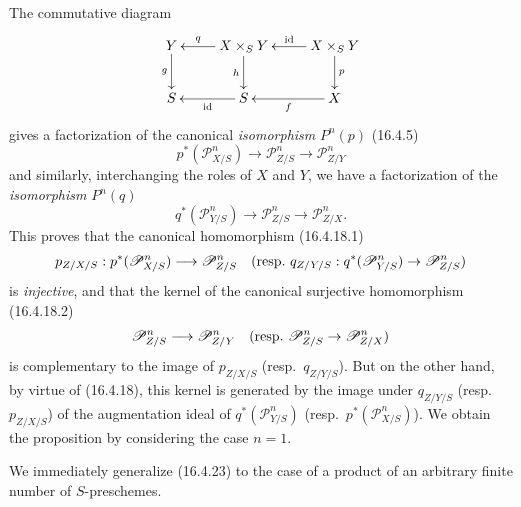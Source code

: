 The commutative diagram
\[
  \xymatrix{
    Y\ar[d]_-g&X\times_S Y\ar[l]_-q\ar[d]_-h&
      X\times_S Y\ar[l]_-{\operatorname{id}}\ar[d]^-p\\
    S&S\ar[l]^-{\operatorname{id}}&X\ar[l]^-f
  }
\]
gives a factorization of the canonical \emph{isomorphism} $P^n(p)$ (16.4.5)
\[
  p^*(\mathscr{P}_{X/S}^n)\longrightarrow
  \mathscr{P}_{Z/S}^n\longrightarrow\mathscr{P}_{Z/Y}^n
\]
and similarly, interchanging the roles of $X$ and $Y$, we have a factorization
of the \emph{isomorphism} $P^n(q)$
\[
  q^*(\mathscr{P}_{Y/S}^n)\longrightarrow
  \mathscr{P}_{Z/S}^n\longrightarrow\mathscr{P}_{Z/X}^n.
\]
This proves that the canonical homomorphism (16.4.18.1)
\[
  p_{Z/X/S}:p^*(\mathscr{P}_{X/S}^n)\longrightarrow\mathscr{P}_{Z/S}^n
  \quad\text{(resp.\
  $q_{Z/Y/S}:q^*(\mathscr{P}_{Y/S}^n)\to\mathscr{P}_{Z/S}^n$)}
\]
is \emph{injective}, and that the kernel of the canonical surjective homomorphism
(16.4.18.2)
\[
  \mathscr{P}_{Z/S}^n\longrightarrow\mathscr{P}_{Z/Y}^n
  \quad\text{(resp.\
  $\mathscr{P}_{Z/S}^n\to\mathscr{P}_{Z/X}^n$)}
\]
is complementary to the image of $p_{Z/X/S}$ (resp.\ $q_{Z/Y/S}$). But
on the other hand, by virtue of (16.4.18), this kernel is generated by the image
under $q_{Z/Y/S}$ (resp.\ $p_{Z/X/S}$) of the augmentation ideal of
$q^*(\mathscr{P}_{Y/S}^n)$ (resp.\ $p^*(\mathscr{P}_{X/S}^n)$). We obtain
the proposition by considering the case $n=1$.

We immediately generalize (16.4.23) to the case of a product of an arbitrary
finite number of $S$-preschemes.

